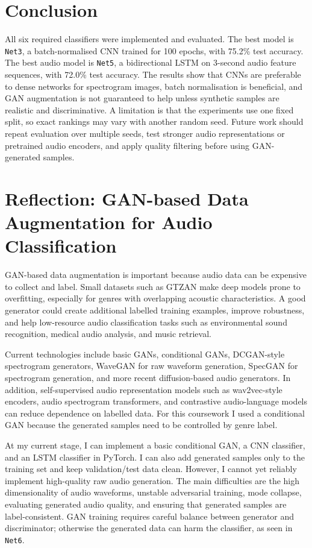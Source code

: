 \documentclass[10pt,twocolumn,letterpaper]{article}
\begin{document}
\section{Conclusion}

All six required classifiers were implemented and evaluated. The best model is \texttt{Net3}, a batch-normalised CNN trained for 100 epochs, with 75.2\% test accuracy. The best audio model is \texttt{Net5}, a bidirectional LSTM on 3-second audio feature sequences, with 72.0\% test accuracy. The results show that CNNs are preferable to dense networks for spectrogram images, batch normalisation is beneficial, and GAN augmentation is not guaranteed to help unless synthetic samples are realistic and discriminative. A limitation is that the experiments use one fixed split, so exact rankings may vary with another random seed. Future work should repeat evaluation over multiple seeds, test stronger audio representations or pretrained audio encoders, and apply quality filtering before using GAN-generated samples.

\clearpage
\section{Reflection: GAN-based Data Augmentation for Audio Classification}

GAN-based data augmentation is important because audio data can be expensive to collect and label. Small datasets such as GTZAN make deep models prone to overfitting, especially for genres with overlapping acoustic characteristics. A good generator could create additional labelled training examples, improve robustness, and help low-resource audio classification tasks such as environmental sound recognition, medical audio analysis, and music retrieval.

Current technologies include basic GANs, conditional GANs, DCGAN-style spectrogram generators, WaveGAN for raw waveform generation, SpecGAN for spectrogram generation, and more recent diffusion-based audio generators. In addition, self-supervised audio representation models such as wav2vec-style encoders, audio spectrogram transformers, and contrastive audio-language models can reduce dependence on labelled data. For this coursework I used a conditional GAN because the generated samples need to be controlled by genre label.

At my current stage, I can implement a basic conditional GAN, a CNN classifier, and an LSTM classifier in PyTorch. I can also add generated samples only to the training set and keep validation/test data clean. However, I cannot yet reliably implement high-quality raw audio generation. The main difficulties are the high dimensionality of audio waveforms, unstable adversarial training, mode collapse, evaluating generated audio quality, and ensuring that generated samples are label-consistent. GAN training requires careful balance between generator and discriminator; otherwise the generated data can harm the classifier, as seen in \texttt{Net6}.
\end{document}
